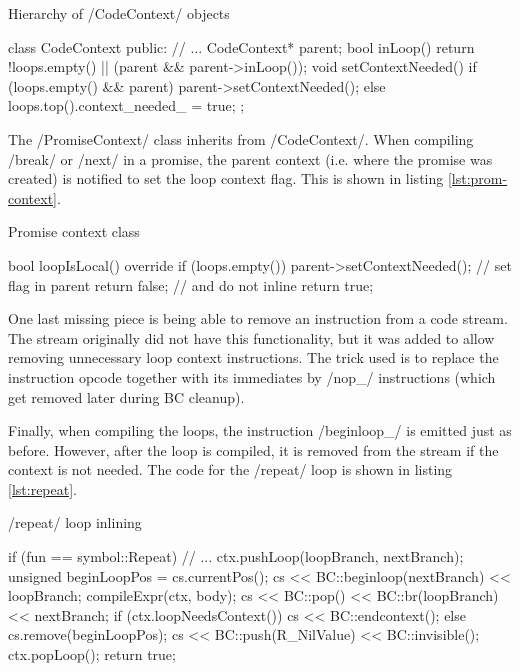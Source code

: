 \begin{listing}[htbp]
  \caption{\label{lst:code-context-parent}Hierarchy of \cppinline/CodeContext/ objects}
  \begin{cppcode}
class CodeContext {
  public:
    // ...
    CodeContext* parent;
    bool inLoop() {
        return !loops.empty() || (parent && parent->inLoop());
    }
    void setContextNeeded() {
        if (loops.empty() && parent)
            parent->setContextNeeded();
        else
            loops.top().context_needed_ = true;
    }
};
  \end{cppcode}
\end{listing}

The \cppinline/PromiseContext/ class inherits from \cppinline/CodeContext/. When compiling \rinline/break/ or \rinline/next/ in a promise, the parent context (i.e. where the promise was created) is notified to set the loop context flag. This is shown in listing \ref{lst:prom-context}.

\begin{listing}[htbp]
  \caption{\label{lst:prom-context}Promise context class}
  \begin{cppcode}
bool loopIsLocal() override {
    if (loops.empty()) {
        parent->setContextNeeded();  // set flag in parent
        return false;  // and do not inline
    }
    return true;
}
  \end{cppcode}
\end{listing}

One last missing piece is being able to remove an instruction from a code stream. The stream originally did not have this functionality, but it was added to allow removing unnecessary loop context instructions. The trick used is to replace the instruction opcode together with its immediates by \cinline/nop_/ instructions (which get removed later during BC cleanup).

Finally, when compiling the loops, the instruction \cinline/beginloop_/ is emitted just as before. However, after the loop is compiled, it is removed from the stream if the context is not needed. The code for the \rinline/repeat/ loop is shown in listing \ref{lst:repeat}.

\begin{listing}[htbp]
  \caption{\label{lst:repeat}\rinline/repeat/ loop inlining}
  \begin{cppcode}
if (fun == symbol::Repeat) {
    // ...
    ctx.pushLoop(loopBranch, nextBranch);
    unsigned beginLoopPos = cs.currentPos();
    cs << BC::beginloop(nextBranch)
       << loopBranch;
    compileExpr(ctx, body);
    cs << BC::pop() << BC::br(loopBranch)
       << nextBranch;
    if (ctx.loopNeedsContext())
        cs << BC::endcontext();
    else
        cs.remove(beginLoopPos);
    cs << BC::push(R_NilValue) << BC::invisible();
    ctx.popLoop();
    return true;
}
  \end{cppcode}
\end{listing}

